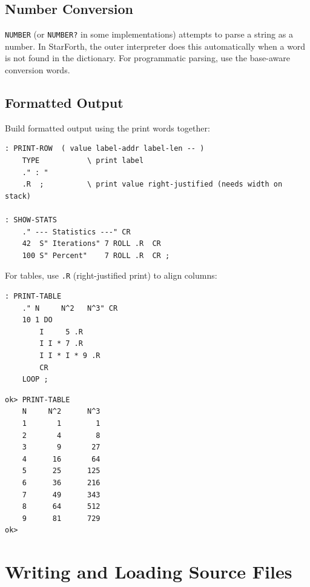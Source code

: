 \section{Number Conversion}
\label{sec:number-convert}

\texttt{NUMBER} (or \texttt{NUMBER?} in some implementations) attempts to
parse a string as a number. In StarForth, the outer interpreter does this
automatically when a word is not found in the dictionary. For programmatic
parsing, use the base-aware conversion words.

\section{Formatted Output}
\label{sec:formatted-output}

Build formatted output using the print words together:

\begin{lstlisting}[language=Forth]
: PRINT-ROW  ( value label-addr label-len -- )
    TYPE           \ print label
    ." : "
    .R  ;          \ print value right-justified (needs width on stack)

: SHOW-STATS
    ." --- Statistics ---" CR
    42  S" Iterations" 7 ROLL .R  CR
    100 S" Percent"    7 ROLL .R  CR ;
\end{lstlisting}

For tables, use \texttt{.R} (right-justified print) to align columns:

\begin{lstlisting}[language=Forth]
: PRINT-TABLE
    ." N     N^2   N^3" CR
    10 1 DO
        I     5 .R
        I I * 7 .R
        I I * I * 9 .R
        CR
    LOOP ;
\end{lstlisting}

\begin{lstlisting}[language=Forth]
ok> PRINT-TABLE
    N     N^2      N^3
    1       1        1
    2       4        8
    3       9       27
    4      16       64
    5      25      125
    6      36      216
    7      49      343
    8      64      512
    9      81      729
ok>
\end{lstlisting}

\chapter{Writing and Loading Source Files}
\label{chap:source-files}

